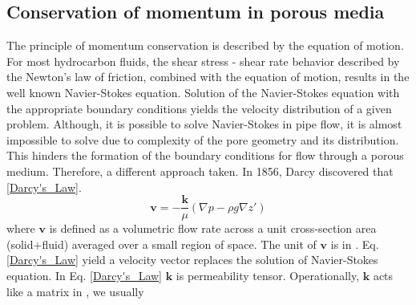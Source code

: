 \documentclass{llncs}
\numberwithin{equation}{section}
\numberwithin{figure}{section}
\numberwithin{table}{section}
\begin{document}
    \subsection{Conservation of momentum in porous media}
    The principle of momentum conservation is described by the equation of motion. For most hydrocarbon fluids, the shear stress - shear rate behavior  described by the Newton's law of friction, combined with the equation of motion, results in the well known Navier-Stokes equation. Solution of the Navier-Stokes equation with the appropriate boundary conditions yields the velocity distribution of a given problem. Although, it is possible to solve Navier-Stokes in pipe flow, it is almost impossible to solve due to complexity of the pore geometry and its distribution. This hinders the formation of the boundary conditions for flow through a porous medium. Therefore, a different approach  taken. In 1856,  Darcy discovered that \ref{Darcy's_Law}.
    \begin{equation}
        \mathbf{v}=-\frac{\mathbf{k}}{\mu }\left( \nabla p-\rho g\nabla z' \right)
        \label{Darcy's_Law}
    \end{equation}
    where $\mathbf{v}$ is defined as a volumetric flow rate across a unit cross-section area (solid+fluid) averaged over a small region of space. The unit of $\mathbf{v}$ is in . Eq. \ref{Darcy's_Law} yield a velocity vector  replaces the solution of Navier-Stokes equation. In Eq. \ref{Darcy's_Law} $\mathbf{k}$ is  permeability tensor. Operationally, $\mathbf{k}$ acts like a matrix in , we usually 
\end{document}

